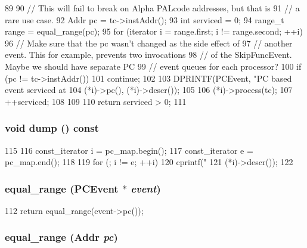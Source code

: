\begin{DoxyCode}
89 {
90     // This will fail to break on Alpha PALcode addresses, but that is
91     // a rare use case.
92     Addr pc = tc->instAddr();
93     int serviced = 0;
94     range_t range = equal_range(pc);
95     for (iterator i = range.first; i != range.second; ++i) {
96         // Make sure that the pc wasn't changed as the side effect of
97         // another event.  This for example, prevents two invocations
98         // of the SkipFuncEvent.  Maybe we should have separate PC
99         // event queues for each processor?
100         if (pc != tc->instAddr())
101             continue;
102 
103         DPRINTF(PCEvent, "PC based event serviced at %
104                 (*i)->pc(), (*i)->descr());
105 
106         (*i)->process(tc);
107         ++serviced;
108     }
109 
110     return serviced > 0;
111 }
\end{DoxyCode}
\hypertarget{classPCEventQueue_a4a4fecb6d7cd9d0b8eb6579eee183af8}{
\subsubsection[{dump}]{\setlength{\rightskip}{0pt plus 5cm}void dump () const}}
\label{classPCEventQueue_a4a4fecb6d7cd9d0b8eb6579eee183af8}



\begin{DoxyCode}
115 {
116     const_iterator i = pc_map.begin();
117     const_iterator e = pc_map.end();
118 
119     for (; i != e; ++i)
120         cprintf("%
121                 (*i)->descr());
122 }
\end{DoxyCode}
\hypertarget{classPCEventQueue_af08617c0ba1693fcac0451031d9c09b9}{
\subsubsection[{equal\_\-range}]{ equal\_\-range ({\bf PCEvent} $\ast$ {\em event})}}
\label{classPCEventQueue_af08617c0ba1693fcac0451031d9c09b9}



\begin{DoxyCode}
112 { return equal_range(event->pc()); }
\end{DoxyCode}
\hypertarget{classPCEventQueue_a543c373cd519b8531e06bb3141f13678}{
\subsubsection[{equal\_\-range}]{ equal\_\-range ({\bf Addr} {\em pc})}}
\label{classPCEventQueue_a543c373cd519b8531e06bb3141f13678}



